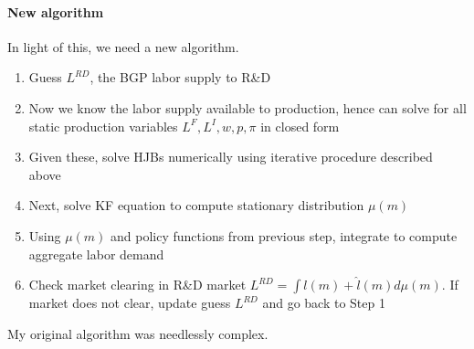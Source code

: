 \documentclass[12pt,english]{article}
\theoremstyle{remark}
\begin{document}
\paragraph{New algorithm}
In light of this, we need a new algorithm.
\begin{enumerate}
	\item Guess $L^{RD}$, the BGP labor supply to R\&D
	\item Now we know the labor supply available to production, hence can solve for all static production variables $L^F,L^I,w,p,\pi$ in closed form
	\item Given these, solve HJBs numerically using iterative procedure described above
	\item Next, solve KF equation to compute stationary distribution $\mu(m)$
	\item Using $\mu(m)$ and policy functions from previous step, integrate to compute aggregate labor demand 
	\item Check market clearing in R\&D market $L^{RD} = \int l(m) + \hat{l}(m) d\mu(m)$. If market does not clear, update guess $L^{RD}$ and go back to Step 1 
\end{enumerate}

My original algorithm was needlessly complex. 
\end{document}
